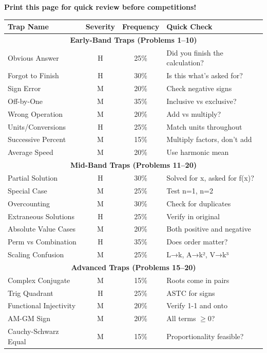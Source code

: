 \documentclass{article}
\begin{document}
\begin{tcolorbox}[colback=yellow!5!white,colframe=yellow!75!black,title={\textbf{One-Page Trap Summary for Exam Day}}]
\textbf{Print this page for quick review before competitions!}

\begin{center}
\begin{tabular}{|l|c|c|l|}
\hline
\textbf{Trap Name} & \textbf{Severity} & \textbf{Frequency} & \textbf{Quick Check} \\
\hline
\multicolumn{4}{|c|}{\textbf{Early-Band Traps (Problems 1--10)}} \\
\hline
Obvious Answer & \colorbox{red!20}{H} & 25\% & Did you finish the calculation? \\
Forgot to Finish & \colorbox{red!20}{H} & 30\% & Is this what's asked for? \\
Sign Error & \colorbox{orange!20}{M} & 20\% & Check negative signs \\
Off-by-One & \colorbox{orange!20}{M} & 35\% & Inclusive vs exclusive? \\
Wrong Operation & \colorbox{orange!20}{M} & 20\% & Add vs multiply? \\
Units/Conversions & \colorbox{red!20}{H} & 25\% & Match units throughout \\
Successive Percent & \colorbox{orange!20}{M} & 15\% & Multiply factors, don't add \\
Average Speed & \colorbox{orange!20}{M} & 20\% & Use harmonic mean \\
\hline
\multicolumn{4}{|c|}{\textbf{Mid-Band Traps (Problems 11--20)}} \\
\hline
Partial Solution & \colorbox{red!20}{H} & 30\% & Solved for x, asked for f(x)? \\
Special Case & \colorbox{orange!20}{M} & 25\% & Test n=1, n=2 \\
Overcounting & \colorbox{orange!20}{M} & 30\% & Check for duplicates \\
Extraneous Solutions & \colorbox{red!20}{H} & 25\% & Verify in original \\
Absolute Value Cases & \colorbox{orange!20}{M} & 20\% & Both positive and negative \\
Perm vs Combination & \colorbox{red!20}{H} & 35\% & Does order matter? \\
Scaling Confusion & \colorbox{orange!20}{M} & 25\% & L→k, A→k², V→k³ \\
\hline
\multicolumn{4}{|c|}{\textbf{Advanced Traps (Problems 15--20)}} \\
\hline
Complex Conjugate & \colorbox{orange!20}{M} & 15\% & Roots come in pairs \\
Trig Quadrant & \colorbox{red!20}{H} & 25\% & ASTC for signs \\
Functional Injectivity & \colorbox{orange!20}{M} & 20\% & Verify 1-1 and onto \\
AM-GM Sign & \colorbox{orange!20}{M} & 20\% & All terms $\geq 0$? \\
Cauchy-Schwarz Equal & \colorbox{orange!20}{M} & 15\% & Proportionality feasible? \\
\hline
\end{tabular}
\end{center}


\end{tcolorbox}
\end{document}
